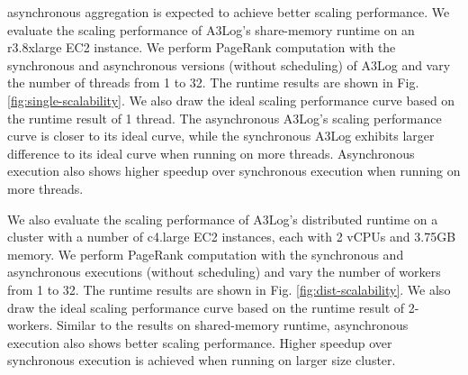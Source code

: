 asynchronous aggregation is expected to achieve better scaling performance. We evaluate the scaling performance of A3Log's share-memory runtime on an r3.8xlarge EC2 instance. We perform PageRank computation with the synchronous and asynchronous versions (without scheduling) of A3Log and vary the number of threads from 1 to 32. The runtime results are shown in Fig.\ref{fig:single-scalability}. We also draw the ideal scaling performance curve based on the runtime result of 1 thread. The asynchronous A3Log's scaling performance curve is closer to its ideal curve, while the synchronous A3Log exhibits larger difference to its ideal curve when running on more threads. Asynchronous execution also shows higher speedup over synchronous execution when running on more threads.

 We also evaluate the scaling performance of A3Log's distributed runtime on a cluster with a number of c4.large EC2 instances, each with 2 vCPUs and 3.75GB memory. We perform PageRank computation with the synchronous and asynchronous executions (without scheduling) and vary the number of workers from 1 to 32. The runtime results are shown in Fig. \ref{fig:dist-scalability}. We also draw the ideal scaling performance curve based on the runtime result of 2-workers. Similar to the results on shared-memory runtime, asynchronous execution also shows better scaling performance. Higher speedup over synchronous execution is achieved when running on larger size cluster.





